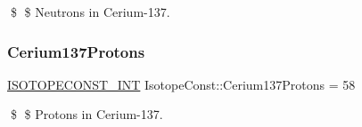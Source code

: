 \$ \$ Neutrons in Cerium-\/137. \mbox{\label{group___isotope_const-_cerium-_ce137_gaaee6a58822cbd8ac166791f5f5d9527f}} 
\subsubsection{\texorpdfstring{Cerium137\+Protons}{Cerium137Protons}}
{\footnotesize\ttfamily \mbox{\hyperlink{group___isotope_const-_macros_ga5f18360b3e99483a35c32d789e62621c}{I\+S\+O\+T\+O\+P\+E\+C\+O\+N\+S\+T\+\_\+\+I\+NT}} Isotope\+Const\+::\+Cerium137\+Protons = 58}

\$ \$ Protons in Cerium-\/137. 